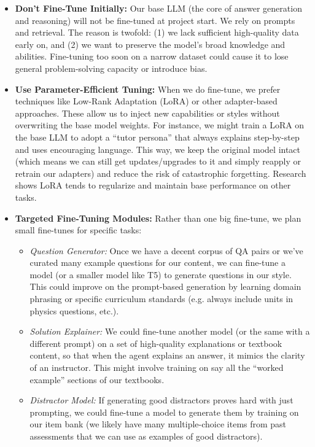 \documentclass[11pt]{article}
\begin{document}
\begin{itemize}
  \item \textbf{Don't Fine-Tune Initially:} Our base LLM (the core of answer generation and reasoning) will not be fine-tuned at project start. We rely on prompts and retrieval. The reason is twofold: (1) we lack sufficient high-quality data early on, and (2) we want to preserve the model’s broad knowledge and abilities. Fine-tuning too soon on a narrow dataset could cause it to lose general problem-solving capacity or introduce bias.
  \item \textbf{Use Parameter-Efficient Tuning:} When we do fine-tune, we prefer techniques like Low-Rank Adaptation (LoRA) or other adapter-based approaches. These allow us to inject new capabilities or styles without overwriting the base model weights. For instance, we might train a LoRA on the base LLM to adopt a “tutor persona” that always explains step-by-step and uses encouraging language. This way, we keep the original model intact (which means we can still get updates/upgrades to it and simply reapply or retrain our adapters) and reduce the risk of catastrophic forgetting. Research shows LoRA tends to regularize and maintain base performance on other tasks.
  \item \textbf{Targeted Fine-Tuning Modules:} Rather than one big fine-tune, we plan small fine-tunes for specific tasks:
    \begin{itemize}
      \item \textit{Question Generator:} Once we have a decent corpus of QA pairs or we’ve curated many example questions for our content, we can fine-tune a model (or a smaller model like T5) to generate questions in our style. This could improve on the prompt-based generation by learning domain phrasing or specific curriculum standards (e.g. always include units in physics questions, etc.).
      \item \textit{Solution Explainer:} We could fine-tune another model (or the same with a different prompt) on a set of high-quality explanations or textbook content, so that when the agent explains an answer, it mimics the clarity of an instructor. This might involve training on say all the “worked example” sections of our textbooks.
      \item \textit{Distractor Model:} If generating good distractors proves hard with just prompting, we could fine-tune a model to generate them by training on our item bank (we likely have many multiple-choice items from past assessments that we can use as examples of good distractors).

\end{itemize}
\end{itemize}
\end{document}
